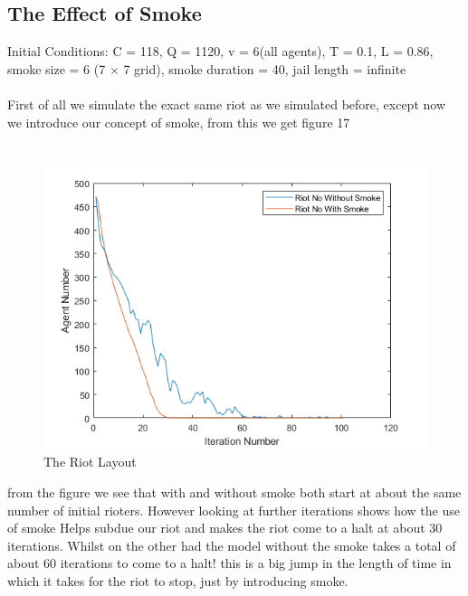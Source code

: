 \documentclass[11pt]{article}
\begin{document}
	\subsection{The Effect of Smoke}
	Initial Conditions: C = 118, Q = 1120, v = 6(all agents), T = 0.1, L = 0.86, smoke size = 6 (7 $\times$ 7 grid), smoke duration = 40, jail length = infinite \\
	\\
	First of all we simulate the exact same riot as we simulated before, except now we introduce our concept of smoke, from this we get figure 17\\
	\\
	\begin{figure}[H]
		\includegraphics[width=\linewidth]{smoke on a riot.png}
		\caption{The Riot Layout}
		\label{fig:frenchriot}
	\end{figure}
	from the figure we see that with and without smoke both start at about the same number of initial rioters. However looking at further iterations shows how the use of smoke Helps subdue our riot and makes the riot come to a halt at about 30 iterations. Whilst on the other had the model without the smoke takes a total of about 60 iterations to come to a halt! this is a big jump in the length of time in which it takes for the riot to stop, just by introducing smoke.\\
	\\

	\newpage
	
\end{document}
